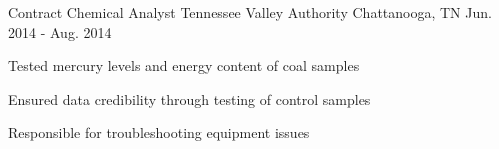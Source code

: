 \begin{cventries}
  \cventry
    {Contract Chemical Analyst} %
    {Tennessee Valley Authority} %
    {Chattanooga, TN} %
    {Jun. 2014 - Aug. 2014} %
    {
      \begin{cvitems} %
        \item {Tested mercury levels and energy content of coal samples}
        \item {Ensured data credibility through testing of control samples}
        \item {Responsible for troubleshooting equipment issues}
      \end{cvitems}
    }

\end{cventries}
